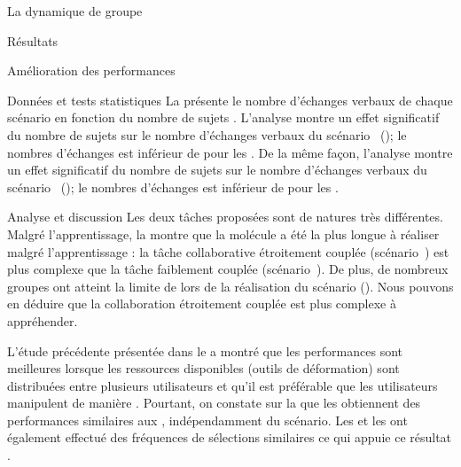 \documentclass[myfrancais,ngerman,english,french]{mythesis}
\begin{document}
\begin{mychapter}{La dynamique de groupe}
\begin{mysection}{Résultats}
\begin{mysubsection}{Amélioration des performances}
\begin{mysubsubsection}{Données et tests statistiques}
					La  présente le nombre d'échanges verbaux  de chaque scénario  en fonction du nombre de sujets .
					L'analyse montre un effet significatif du nombre de sujets  sur le nombre d'échanges verbaux  du scénario~ (); le nombres d'échanges est inférieur de  pour les .
					De la même façon, l'analyse montre un effet significatif du nombre de sujets  sur le nombre d'échanges verbaux  du scénario~ (); le nombres d'échanges est inférieur de  pour les .
				\end{mysubsubsection}
				\begin{mysubsubsection}{Analyse et discussion}
					Les deux tâches proposées sont de natures très différentes.
					Malgré l'apprentissage, la  montre que la molécule \myUbiquitin a été la plus longue à réaliser malgré l'apprentissage : la tâche collaborative étroitement couplée (scénario~) est plus complexe que la tâche faiblement couplée (scénario~).
					De plus, de nombreux groupes ont atteint la limite de  lors de la réalisation du scénario  (\myUbiquitin).
					Nous pouvons en déduire que la collaboration étroitement couplée est plus complexe à appréhender.

					L'étude précédente présentée dans le  a montré que les performances sont meilleures lorsque les ressources disponibles (outils de déformation) sont distribuées entre plusieurs utilisateurs et qu'il est préférable que les utilisateurs manipulent de manière .
					Pourtant, on constate sur la  que les  obtiennent des performances similaires aux , indépendamment du scénario.
					Les  et les  ont également effectué des fréquences de sélections similaires ce qui appuie ce résultat .


\end{mysubsubsection}
\end{mysubsection}
\end{mysection}
\end{mychapter}
\end{document}
